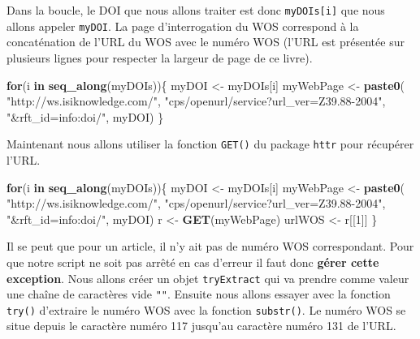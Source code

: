 \documentclass[
]{book}
\newenvironment{Shaded}{\begin{snugshade}}{\end{snugshade}}
\newcommand{\ControlFlowTok}[1]{\textcolor[rgb]{0.13,0.29,0.53}{\textbf{#1}}}
\newcommand{\DecValTok}[1]{\textcolor[rgb]{0.00,0.00,0.81}{#1}}
\newcommand{\KeywordTok}[1]{\textcolor[rgb]{0.13,0.29,0.53}{\textbf{#1}}}
\newcommand{\NormalTok}[1]{#1}
\newcommand{\StringTok}[1]{\textcolor[rgb]{0.31,0.60,0.02}{#1}}
\begin{document}
Dans la boucle, le DOI que nous allons traiter est donc \texttt{myDOIs{[}i{]}} que nous allons appeler \texttt{myDOI}. La page d'interrogation du WOS correspond à la concaténation de l'URL du WOS avec le numéro WOS (l'URL est présentée sur plusieurs lignes pour respecter la largeur de page de ce livre).

\begin{Shaded}
\begin{Highlighting}[]
\ControlFlowTok{for}\NormalTok{(i }\ControlFlowTok{in} \KeywordTok{seq_along}\NormalTok{(myDOIs))\{}
\NormalTok{  myDOI <-}\StringTok{ }\NormalTok{myDOIs[i]}
\NormalTok{  myWebPage <-}\StringTok{ }\KeywordTok{paste0}\NormalTok{(}
    \StringTok{"http://ws.isiknowledge.com/"}\NormalTok{, }
    \StringTok{"cps/openurl/service?url_ver=Z39.88-2004"}\NormalTok{, }
    \StringTok{"&rft_id=info:doi/"}\NormalTok{, myDOI)}
\NormalTok{\}}
\end{Highlighting}
\end{Shaded}

Maintenant nous allons utiliser la fonction \texttt{GET()} du package \texttt{httr} pour récupérer l'URL.

\begin{Shaded}
\begin{Highlighting}[]
\ControlFlowTok{for}\NormalTok{(i }\ControlFlowTok{in} \KeywordTok{seq_along}\NormalTok{(myDOIs))\{}
\NormalTok{  myDOI <-}\StringTok{ }\NormalTok{myDOIs[i]}
\NormalTok{  myWebPage <-}\StringTok{ }\KeywordTok{paste0}\NormalTok{(}
    \StringTok{"http://ws.isiknowledge.com/"}\NormalTok{, }
    \StringTok{"cps/openurl/service?url_ver=Z39.88-2004"}\NormalTok{, }
    \StringTok{"&rft_id=info:doi/"}\NormalTok{, myDOI)}
\NormalTok{  r <-}\StringTok{ }\KeywordTok{GET}\NormalTok{(myWebPage)}
\NormalTok{  urlWOS <-}\StringTok{ }\NormalTok{r[[}\DecValTok{1}\NormalTok{]]}
\NormalTok{\}}
\end{Highlighting}
\end{Shaded}

Il se peut que pour un article, il n'y ait pas de numéro WOS correspondant. Pour que notre script ne soit pas arrêté en cas d'erreur il faut donc \textbf{gérer cette exception}. Nous allons créer un objet \texttt{tryExtract} qui va prendre comme valeur une chaîne de caractères vide \texttt{""}. Ensuite nous allons essayer avec la fonction \texttt{try()} d'extraire le numéro WOS avec la fonction \texttt{substr()}. Le numéro WOS se situe depuis le caractère numéro 117 jusqu'au caractère numéro 131 de l'URL.
\end{document}
